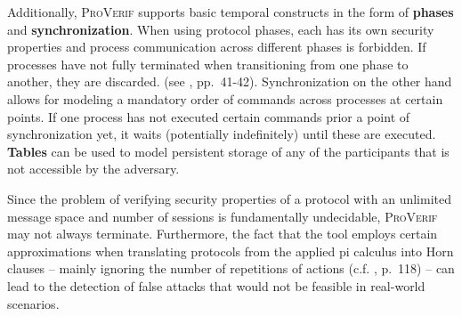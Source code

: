 Additionally, \textsc{ProVerif} supports basic temporal constructs in the form of \textbf{phases} and \textbf{synchronization}.
When using protocol phases, each has its own security properties and process communication across different phases is forbidden.
If processes have not fully terminated when transitioning from one phase to another, they are discarded. (see \cite{blanchet2020proverif}, pp.~41-42).
Synchronization on the other hand allows for modeling a mandatory order of commands across processes at certain points.
If one process has not executed certain commands prior a point of synchronization yet, it waits (potentially indefinitely) until these are executed.
\textbf{Tables} can be used to model persistent storage of any of the participants that is not accessible by the adversary.

Since the problem of verifying security properties of a protocol with an unlimited message space and number of sessions is fundamentally undecidable, \textsc{ProVerif} may not always terminate.
Furthermore, the fact that the tool employs certain approximations when translating protocols from the applied pi calculus into Horn clauses -- mainly ignoring the number of repetitions of actions (c.f. \cite{blanchet2020proverif}, p.~118) -- can lead to the detection of false attacks that would not be feasible in real-world scenarios.
